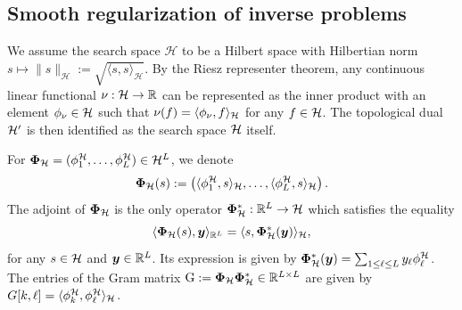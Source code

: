 \documentclass[12pt]{article}
\begin{document}
    \subsection{Smooth regularization of inverse problems}

    {We assume the search space $\mathcal{H}$ to be a Hilbert space with Hilbertian norm $s \mapsto \| s \|_\mathcal{H} := \sqrt{\langle s, s \rangle_{\mathcal{H}}}$. By the Riesz representer theorem, any continuous linear functional $\nu: \mathcal{H} \to \mathbb{R}$ can be represented as the inner product with an element $\phi_\nu \in \mathcal{H}$ such that $\nu(f) = \langle \phi_\nu, f \rangle_{\mathcal{H}}$ for any $f \in \mathcal{H}$. The topological dual $\mathcal{H}'$ is then identified as the search space $\mathcal{H}$ itself.}

    {
    For $\bm{\Phi}_\mathcal{H}= (\phi^\mathcal{H}_1 ,\ldots , \phi^\mathcal{H}_L) \in \mathcal{H}^L$, we denote
    \begin{equation}
        \bm{\Phi}_\mathcal{H}(s) := \left( \langle \phi^\mathcal{H}_1, s \rangle_{\mathcal{H}} , \ldots , \langle \phi^\mathcal{H}_L, s \rangle_{\mathcal{H}} \right). 
        \label{eq:phi-hilbert}
    \end{equation}
    The adjoint of $\bm{\Phi}_\mathcal{H}$ is the only operator $\bm{\Phi}_\mathcal{H}^* : \mathbb{R}^L \rightarrow \mathcal{H}$ which satisfies the equality %
    \begin{equation*}
        \langle \bm{\Phi}_\mathcal{H}(s), \bm{y}\rangle_{\mathbb{R}^L} = \langle s, \bm{\Phi}_\mathcal{H}^*(\bm{y})\rangle_{\mathcal{H}},
    \end{equation*}
    for any $s \in \mathcal{H}$ and $\bm{y}\in\mathbb{R}^L$.
    Its expression is given by $\bm{\Phi}_\mathcal{H}^* (\bm{y}) = \sum_{1 \leq \ell \leq L} y_\ell \phi^\mathcal{H}_\ell$.
    The entries of the Gram matrix $\mathrm{G} := \bm{\Phi}_\mathcal{H} \bm{\Phi}_\mathcal{H}^* \in \mathbb{R}^{L\times L}$ are given by $G[k,\ell] = \langle \phi^\mathcal{H}_k , \phi^\mathcal{H}_\ell \rangle_{\mathcal{H}}$.}

    
\end{document}

